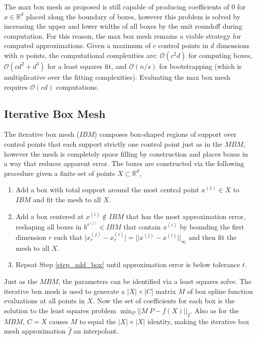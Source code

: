 The max box mesh as proposed is still capable of producing coefficients of 0 for $x \in \mathbb{R}^d$ placed along the boundary of boxes, however this problem is solved by increasing the upper and lower widths of all boxes by the unit roundoff during computation. For this reason, the max box mesh remains a viable strategy for computed approximations. Given a maximum of $c$ control points in $d$ dimensions with $n$ points, the computational complexities are: $\mathcal{O}(c^2 d)$ for computing boxes, $\mathcal{O}(c d^2 + d^3)$ for a least squares fit, and $\mathcal{O}(n / s)$ for bootstrapping (which is multiplicative over the fitting complexities). Evaluating the max box mesh requires $\mathcal{O}(c d)$ computations.

\subsection{Iterative Box Mesh}

The iterative box mesh ($IBM$) composes box-shaped regions of support over control points that each support strictly one control point just as in the $MBM$, however the mesh is completely space filling by construction and places boxes in a way that reduces apparent error. The boxes are constructed via the following procedure given a finite set of points $X \subset \mathbb{R}^d$,
\begin{enumerate}
\item Add a box with total support around the most central point $x^{(1)} \in X$ to $IBM$ and fit the mesh to all $X$.
\item Add a box centered at $x^{(i)} \notin IBM$ that has the most approximation error, reshaping all boxes in $b^{x^{(j)}} \in IBM$ that contain $x^{(i)}$ by bounding the first dimension $r$ such that $\bigl| x^{(j)}_r - x^{(i)}_r \bigr| = \bigl| \bigl| x^{(j)} - x^{(i)} \bigr| \bigr|_\infty$ and then fit the mesh to all $X$. \label{step_add_box}
\item Repeat Step \ref{step_add_box} until approximation error is below tolerance $t$.
\end{enumerate}

Just as the $MBM$, the parameters can be identified via a least squares solve. The iterative box mesh is used to generate a $|X| \times |C|$ matrix $M$ of box spline function evaluations at all points in $X$. Now the set of coefficients for each box is the solution to the least squares problem $\min_P \bigl|\bigl| M\ P - f(X) \bigr|\bigr|_2$. Also as for the $MBM$, $C = X$ causes $M$ to equal the $|X| \times |X|$ identity, making the iterative box mesh approximation $\hat f$ an interpolant.

